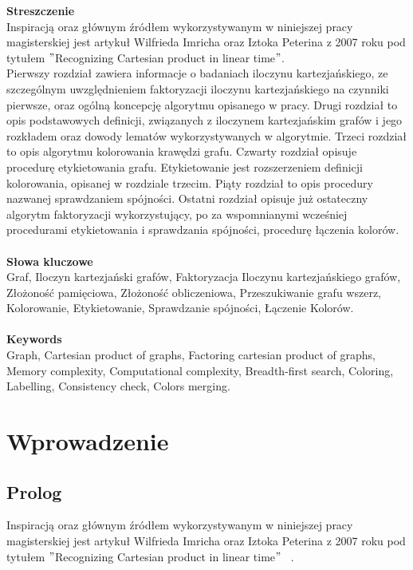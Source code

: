 \documentclass[12pt,a4paper,titlepage]{article}
\begin{document}
\textbf{Streszczenie}\\

Inspiracją oraz głównym źródłem wykorzystywanym w niniejszej pracy magisterskiej jest artykuł Wilfrieda Imricha oraz Iztoka Peterina z 2007 roku pod tytułem $"$Recognizing Cartesian product in linear time$"$. \\
Pierwszy rozdział zawiera informacje o badaniach iloczynu kartezjańskiego, ze szczególnym uwzględnieniem faktoryzacji iloczynu kartezjańskiego na czynniki pierwsze, oraz ogólną koncepcję algorytmu opisanego w pracy. Drugi rozdział to opis podstawowych definicji, związanych z iloczynem kartezjańskim grafów i jego rozkładem oraz dowody lematów wykorzystywanych w algorytmie. Trzeci rozdział to opis algorytmu kolorowania krawędzi grafu. Czwarty rozdział opisuje procedurę etykietowania grafu. Etykietowanie jest rozszerzeniem definicji kolorowania, opisanej w rozdziale trzecim. Piąty rozdział to opis procedury nazwanej sprawdzaniem spójności. Ostatni rozdział opisuje już ostateczny algorytm faktoryzacji wykorzystujący, po za wspomnianymi wcześniej procedurami etykietowania i sprawdzania spójności, procedurę łączenia kolorów. \\
\\
\textbf{Słowa kluczowe}\\

Graf, Iloczyn kartezjański grafów, Faktoryzacja Iloczynu kartezjańskiego grafów, Złożoność pamięciowa, Złożoność obliczeniowa, Przeszukiwanie grafu wszerz, Kolorowanie,
Etykietowanie, Sprawdzanie spójności, Łączenie Kolorów.\\
\\
\textbf{Keywords}\\

Graph, Cartesian product of graphs, Factoring cartesian product of graphs, Memory complexity, Computational complexity, Breadth-first search, Coloring,
Labelling, Consistency check, Colors merging.
\newpage
\tableofcontents
\newpage
\section{Wprowadzenie}
\subsection{Prolog}
Inspiracją oraz głównym źródłem wykorzystywanym w niniejszej pracy magisterskiej jest artykuł Wilfrieda Imricha oraz Iztoka Peterina z 2007 roku pod tytułem $"$Recognizing Cartesian product in linear time$"$ ~\cite{MAIN}. \\
\\
\end{document}
